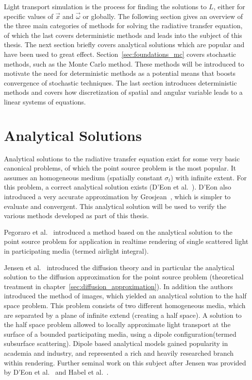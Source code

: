 Light transport simulation is the process for finding the solutions to $L$, either for specific values of $\vec{x}$ and $\vec{\omega}$ or globally. The following section gives an overview of the three main categories of methods for solving the radiative transfer equation, of which the last covers deterministic methods and leads into the subject of this thesis. The next section briefly covers analytical solutions which are popular and have been used to great effect. Section~\ref{sec:foundations_mc} covers stochastic methods, such as the Monte Carlo method. These methods will be introduced to motivate the need for deterministic methods as a potential means that boosts convergence of stochastic techniques. The last section introduces deterministic methods and covers how discretization of spatial and angular variable leads to a linear systems of equations.

\section{Analytical Solutions}
\label{sec:foundations_analytical}

Analytical solutions to the radiative transfer equation exist for some very basic canonical problems, of which the point source problem is the most popular. It assumes an homogeneous medium (spatially constant $\sigma_t$) with infinite extent. For this problem, a correct analytical solution exists (D'Eon et al.~\cite{dEon11}). D'Eon also introduced a very accurate approximation by Grosjean~\cite{Grosjean56}, which is simpler to evaluate and convergent. This analytical solution will be used to verify the various methods developed as part of this thesis.

Pegoraro et al.~\cite{Pegoraro11} introduced a method based on the analytical solution to the point source problem for application in realtime rendering of single scattered light in participating media (termed airlight integral).

Jensen et al.~\cite{Jensen01} introduced the diffusion theory and in particular the analytical solution to the diffusion approximation for the point source problem (theoretical treatment in chapter~\ref{sec:diffusion_approximation}). In addition the authors introduced the method of images, which yielded an analytical solution to the half space problem. This problem consists of two different homogeneous media, which are separated by a plane of infinite extend (creating a half space). A solution to the half space problem allowed to locally approximate light transport at the surface of a bounded participating media, using a dipole configuration(termed subsurface scattering). Dipole based analytical models gained popularity in academia and industry, and represented a rich and heavily researched branch within rendering. Further seminal work on this subject after Jensen was provided by D'Eon et al.~\cite{dEon11} and Habel et al.~\cite{Habel13}.

